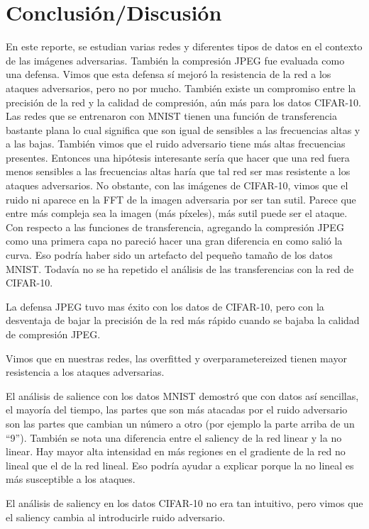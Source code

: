 \section{Conclusión/Discusión}
En este reporte, se estudian varias redes y diferentes tipos de datos en el contexto de las imágenes adversarias. También la compresión JPEG fue evaluada como una defensa. Vimos que esta defensa sí mejoró la resistencia de la red a los ataques adversarios, pero no por mucho. También existe un compromiso entre la precisión de la red y la calidad de compresión, aún más para los datos CIFAR-10. Las redes que se entrenaron con MNIST tienen una función de transferencia bastante plana lo cual significa que son igual de sensibles a las frecuencias altas y a las bajas. También vimos que el ruido adversario tiene más altas frecuencias presentes. Entonces una hipótesis interesante sería que hacer que una red fuera menos sensibles a las frecuencias altas haría que tal red ser mas resistente a los ataques adversarios. No obstante, con las imágenes de CIFAR-10, vimos que el ruido ni aparece en la FFT de la imagen adversaria por ser tan sutil. Parece que entre más compleja sea la imagen (más píxeles), más sutil puede ser el ataque. Con respecto a las funciones de transferencia, agregando la compresión JPEG como una primera capa no pareció hacer una gran diferencia en como salió la curva. Eso podría haber sido un artefacto del pequeño tamaño de los datos MNIST. Todavía no se ha repetido el análisis de las transferencias con la red de CIFAR-10.

La defensa JPEG tuvo mas éxito con los datos de CIFAR-10, pero con la desventaja de bajar la precisión de la red más rápido cuando se bajaba la calidad de compresión JPEG.

Vimos que en nuestras redes, las overfitted y overparametereized tienen mayor resistencia a los ataques adversarias. 

El análisis de salience con los datos MNIST demostró que con datos así sencillas, el mayoría del tiempo, las partes que son más atacadas por el ruido adversario son las partes que cambian un número a otro (por ejemplo la parte arriba de un ``9''). También se nota una diferencia entre el saliency de la red linear y la no linear. Hay mayor alta intensidad en más regiones en el gradiente de la red no lineal que el de la red lineal. Eso podría ayudar a explicar porque la no lineal es más susceptible a los ataques.

El análisis de saliency en los datos CIFAR-10 no era tan intuitivo, pero vimos que el saliency cambia al introducirle ruido adversario.